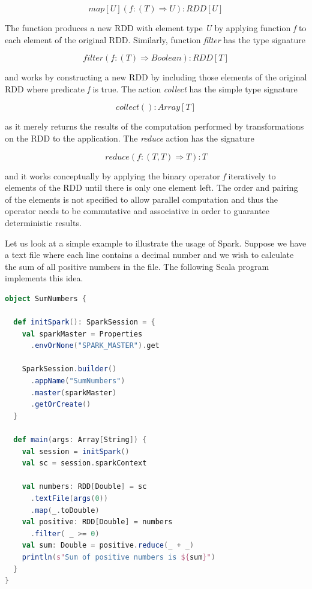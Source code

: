 \[map[U](f: (T) \Rightarrow U): RDD[U]\]

The function produces a new RDD with element type \textit{U} by applying function \textit{f} to each element of the original RDD. Similarly, function \textit{filter} has the type signature

\[filter(f: (T) \Rightarrow Boolean): RDD[T]\]

and works by constructing a new RDD by including those elements of the original RDD where predicate \textit{f} is true. The action \textit{collect} has the simple type signature 

\[collect(): Array[T]\]

as it merely returns the results of the computation performed by transformations on the RDD to the application. The \textit{reduce} action has the signature

\[reduce(f: (T, T) \Rightarrow T): T\]

and it works conceptually by applying the binary operator \textit{f} iteratively to elements of the RDD until there is only one element left. The order and pairing of the elements is not specified to allow parallel computation and thus the operator needs to be commutative and associative in order to guarantee deterministic results. 

Let us look at a simple example to illustrate the usage of Spark. Suppose we have a text file where each line contains a decimal number and we wish to calculate the sum of all positive numbers in the file. The following Scala program implements this idea.  

\begin{minipage}{0.95\linewidth}
\begin{lstlisting}[language=scala] 
object SumNumbers {

  def initSpark(): SparkSession = {
    val sparkMaster = Properties
      .envOrNone("SPARK_MASTER").get

    SparkSession.builder()
      .appName("SumNumbers")
      .master(sparkMaster)
      .getOrCreate()
  }

  def main(args: Array[String]) {
    val session = initSpark()
    val sc = session.sparkContext

    val numbers: RDD[Double] = sc
      .textFile(args(0))
      .map(_.toDouble)
    val positive: RDD[Double] = numbers
      .filter( _ >= 0)
    val sum: Double = positive.reduce(_ + _)
    println(s"Sum of positive numbers is ${sum}")
  }
}        
\end{lstlisting}
\end{minipage}

